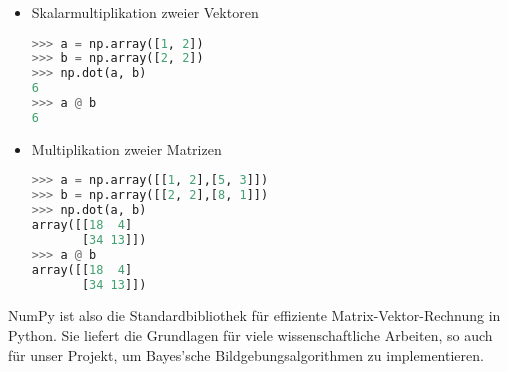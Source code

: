 \begin{itemize}
    \item Skalarmultiplikation zweier Vektoren

        \begin{lstlisting}[language=python]
>>> a = np.array([1, 2])
>>> b = np.array([2, 2])
>>> np.dot(a, b)
6
>>> a @ b
6
\end{lstlisting}

  \item Multiplikation zweier Matrizen

        \begin{lstlisting}[language=python]
>>> a = np.array([[1, 2],[5, 3]])
>>> b = np.array([[2, 2],[8, 1]])
>>> np.dot(a, b)
array([[18  4]
       [34 13]])
>>> a @ b
array([[18  4]
       [34 13]])
\end{lstlisting}

\end{itemize}

NumPy ist also die Standardbibliothek für effiziente Matrix-Vektor-Rechnung in Python. Sie liefert die Grundlagen für viele wissenschaftliche Arbeiten, so auch für unser Projekt, um Bayes'sche Bildgebungsalgorithmen zu implementieren.
